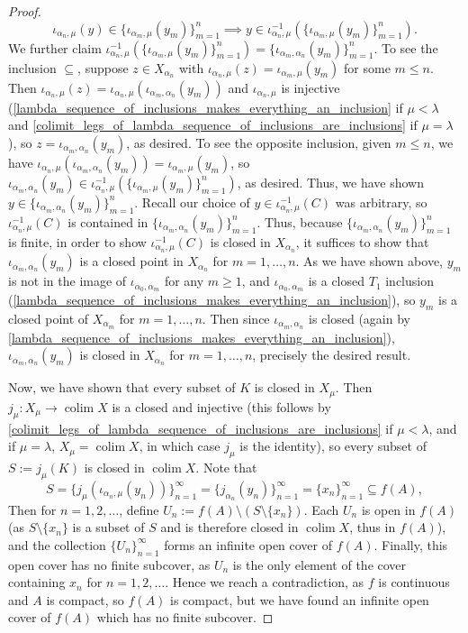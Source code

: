 \documentclass{amsart}
\theoremstyle{plain}
\theoremstyle{definition}
\newcommand{\sseq}{\subseteq}
\newcommand{\0}{\mathbf{0}}
\renewcommand{\(}{\left(}
\renewcommand{\)}{\right)}
\DeclareMathOperator*{\colim}{colim}
\begin{document}
\begin{proof}
  \[\iota_{\alpha_n,\mu}(y)\in\{\iota_{\alpha_m,\mu}(y_m)\}_{m=1}^n\implies y\in\iota_{\alpha_n,\mu}^{-1}(\{\iota_{\alpha_m,\mu}(y_m)\}_{m=1}^n).\]
  We further claim $\iota_{\alpha_n,\mu}^{-1}(\{\iota_{\alpha_m,\mu}(y_m)\}_{m=1}^n)=\{\iota_{\alpha_m,\alpha_n}(y_m)\}_{m=1}^n$. To see the inclusion $\sseq$, suppose $z\in X_{\alpha_n}$ with $\iota_{\alpha_n,\mu}(z)=\iota_{\alpha_m,\mu}(y_m)$ for some $m\leq n$. Then $\iota_{\alpha_n,\mu}(z)=\iota_{\alpha_n,\mu}(\iota_{\alpha_m,\alpha_n}(y_m))$ and $\iota_{\alpha_n,\mu}$ is injective (\autoref{lambda_sequence_of_inclusions_makes_everything_an_inclusion} if $\mu<\lambda$ and \autoref{colimit_legs_of_lambda_sequence_of_inclusions_are_inclusions} if $\mu=\lambda$), so $z=\iota_{\alpha_m,\alpha_n}(y_m)$, as desired. To see the opposite inclusion, given $m\leq n$, we have $\iota_{\alpha_n,\mu}(\iota_{\alpha_m,\alpha_n}(y_m))=\iota_{\alpha_m,\mu}(y_m)$, so $\iota_{\alpha_m,\alpha_n}(y_m)\in \iota_{\alpha_n,\mu}^{-1}(\{\iota_{\alpha_m,\mu}(y_m)\}_{m=1}^n)$, as desired. Thus, we have shown $y\in\{\iota_{\alpha_m,\alpha_n}(y_m)\}_{m=1}^n$. Recall our choice of $y\in\iota_{\alpha_n,\mu}^{-1}(C)$ was arbitrary, so $\iota_{\alpha_n,\mu}^{-1}(C)$ is contained in $\{\iota_{\alpha_m,\alpha_n}(y_m)\}_{m=1}^n$. Thus, because $\{\iota_{\alpha_m,\alpha_n}(y_m)\}_{m=1}^n$ is finite, in order to show $\iota_{\alpha_n,\mu}^{-1}(C)$ is closed in $X_{\alpha_n}$, it suffices to show that $\iota_{\alpha_m,\alpha_n}(y_m)$ is a closed point in $X_{\alpha_n}$ for $m=1,\ldots,n$. As we have shown above, $y_m$ is not in the image of $\iota_{\alpha_0,\alpha_m}$ for any $m\geq1$, and $\iota_{\alpha_0,\alpha_m}$ is a closed $T_1$ inclusion (\autoref{lambda_sequence_of_inclusions_makes_everything_an_inclusion}), so $y_m$ is a closed point of $X_{\alpha_m}$ for $m=1,\ldots,n$. Then since $\iota_{\alpha_m,\alpha_n}$ is closed (again by \autoref{lambda_sequence_of_inclusions_makes_everything_an_inclusion}), $\iota_{\alpha_m,\alpha_n}(y_m)$ is closed in $X_{\alpha_n}$ for $m=1,\ldots,n$, precisely the desired result.

  Now, we have shown that every subset of $K$ is closed in $X_{\mu}$. Then $j_\mu:X_\mu\to\colim X$ is a closed and injective (this follows by \autoref{colimit_legs_of_lambda_sequence_of_inclusions_are_inclusions} if $\mu<\lambda$, and if $\mu=\lambda$, $X_\mu=\colim X$, in which case $j_\mu$ is the identity), so every subset of $S:=j_\mu(K)$ is closed in $\colim X$. Note that
  \[S=\{j_\mu(\iota_{\alpha_n,\mu}(y_n))\}_{n=1}^\infty=\{j_{\alpha_n}(y_n)\}_{n=1}^\infty=\{x_n\}_{n=1}^\infty\sseq f(A),\]
  Then for $n=1,2,\ldots$, define $U_n:=f(A)\setminus (S\setminus\{x_n\})$. Each $U_n$ is open in $f(A)$ (as $S\setminus\{x_n\}$ is a subset of $S$ and is therefore closed in $\colim X$, thus in $f(A)$), and the collection $\{U_n\}_{n=1}^\infty$ forms an infinite open cover of $f(A)$. Finally, this open cover has no finite subcover, as $U_n$ is the only element of the cover containing $x_n$ for $n=1,2,\ldots$. Hence we reach a contradiction, as $f$ is continuous and $A$ is compact, so $f(A)$ is compact, but we have found an infinite open cover of $f(A)$ which has no finite subcover.
\end{proof}
\end{document}

